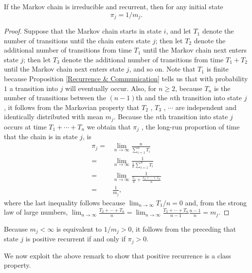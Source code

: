 \begin{proposition}
    If the Markov chain is irreducible and recurrent, then for any initial state
    $$
    \pi_j = 1/m_j.
    $$
    \begin{proof}
        Suppose that the Markov chain starts in state $i$, and let $T_1$ denote the number of transitions until the chain enters state $j$; then let $T_2$ denote the additional number of transitions from time $T_1$ until the Markov chain next enters state $j$; then let $T_3$ denote the additional number of transitions from time $T_1 + T_2$ until the Markov chain next enters state $j$, and so on. Note that $T_1$ is finite because Proposition \ref{Recurrence & Communication} tells us that with probability $1$ a transition into $j$ will eventually occur. Also, for $n \ge 2$, because $T_n$ is the number of transitions between the $(n − 1)$th and the $n$th transition into state $j$ , it follows from the Markovian property that $T_2$ , $T_3$ , $\cdots$ are independent and identically distributed with mean $m_j$. Because the $n$th transition into state $j$ occurs at time $T_1 + \cdots + T_n$ we obtain that $\pi_j$ , the long-run proportion of time that the chain is in state $j$, is 
        \begin{align*}
            \pi_j = & \lim_{n\to\infty} \frac{n}{\sum_{i=1}^n T_i} \\ 
            = & \lim_{n\to\infty} \frac{1}{\frac{1}{n}\sum_{i=1}^n T_i} \\ 
            = & \lim_{n\to\infty} \frac{1}{\frac{T_1}{n} + \frac{T_2 + \cdots + T_n}{n}} \\ 
            = & \frac{1}{m_j},
        \end{align*}
        where the last inequality follows because $\lim_{n\to\infty} T_1/n = 0$ and, from the strong law of large numbers, $\lim_{n\to\infty} \frac{T_2 + \cdots + T_n}{n} = \lim_{n \to \infty} \frac{T_2 + \cdots + T_n}{n-1} \frac{n-1}{n} = m_j$.
    \end{proof}
\end{proposition}

\begin{remark}
    Because $m_j < \infty$ is equivalent to $1/m_j > 0$, it follows from the preceding that state $j$ is positive recurrent if and only if $\pi_j > 0$. 
\end{remark}

We now exploit the above remark to show that positive recurrence is a class property.

